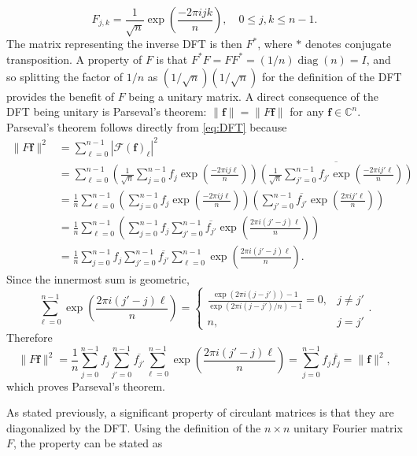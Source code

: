 \documentclass[12pt]{book}
\newcommand{\ctrans}{*}	%
\DeclareMathOperator{\diag}{diag}	%
\begin{document}
\begin{equation}
F_{j,k} = \frac{1}{\sqrt{n}}\exp\left(\frac{-2\pi{ijk}}{n}\right), \quad 0 \leq j,k \leq n-1.
\label{eq:DFT-Matrix}
\end{equation}
The matrix representing the inverse DFT is then $F^\ctrans$, where $\ctrans$ denotes conjugate transposition. A property of $F$ is that $F^\ctrans F = FF^\ctrans = (1/n)\diag(n) = I$, and so splitting the factor of $1/n$ as $(1/\sqrt{n})(1/\sqrt{n})$ for the definition of the DFT provides the benefit of $F$ being a unitary matrix. A direct consequence of the DFT being unitary is Parseval's theorem: $\|\mathbf{f}\| = \|F\mathbf{f}\|$ for any $\mathbf{f} \in \mathbb{C}^n$. Parseval's theorem follows directly from \eqref{eq:DFT} because
\begin{align*}
\|F\mathbf{f}\|^2 &= \sum_{\ell=0}^{n-1} |\mathcal{F}(\mathbf{f})_\ell |^2 \\
&= \sum_{\ell=0}^{n-1} \left(\frac{1}{\sqrt{n}}\sum_{j=0}^{n-1} f_{j}\exp\left(\frac{-2\pi{ij\ell}}{n}\right)\right)\overline{\left(\frac{1}{\sqrt{n}}\sum_{j'=0}^{n-1} f_{j'}\exp\left(\frac{-2\pi{ij'\ell}}{n}\right)\right)} \\
&= \frac{1}{n} \sum_{\ell=0}^{n-1} \left(\sum_{j=0}^{n-1} f_{j}\exp\left(\frac{-2\pi{ij\ell}}{n}\right)\right) \left(\sum_{j'=0}^{n-1} \overline{f_{j'}}\exp\left(\frac{2\pi{ij'\ell}}{n}\right)\right) \\
&= \frac{1}{n} \sum_{\ell=0}^{n-1} \left(\sum_{j=0}^{n-1} f_{j} \sum_{j'=0}^{n-1} \overline{f_{j'}} \exp\left(\frac{2\pi{i(j'-j)\ell}}{n}\right)\right) \\
&= \frac{1}{n} \sum_{j=0}^{n-1} f_j \sum_{j'=0}^{n-1} \overline{f_{j'}} \sum_{\ell=0}^{n-1} \exp\left(\frac{2\pi{i(j'-j)\ell}}{n}\right).
\end{align*}
Since the innermost sum is geometric,
\[\sum_{\ell=0}^{n-1} \exp\left(\frac{2\pi{i(j'-j)\ell}}{n}\right) = \begin{cases}
\frac{\exp(2\pi{i}(j-j')) - 1}{\exp(2\pi{i}(j-j')/n) - 1} = 0, & j \neq j' \\
n, & j = j'
\end{cases}.\]
Therefore
\[\|F\mathbf{f}\|^2 = \frac{1}{n} \sum_{j=0}^{n-1} f_j \sum_{j'=0}^{n-1} \overline{f_{j'}} \sum_{\ell=0}^{n-1} \exp\left(\frac{2\pi{i(j'-j)\ell}}{n}\right) = \sum_{j=0}^{n-1} f_j\overline{f_j} = \|\mathbf{f}\|^2,\]
which proves Parseval's theorem. \par
As stated previously, a significant property of circulant matrices is that they are diagonalized by the DFT. Using the definition of the $n \times n$ unitary Fourier matrix $F$, the property can be stated as
\end{document}
